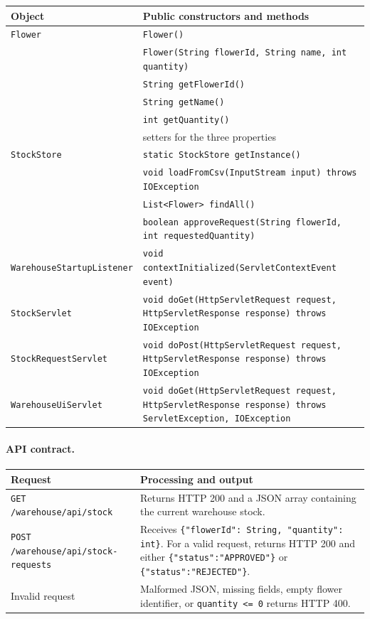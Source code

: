 \documentclass[12pt,a4paper]{article}
\begin{document}
\begin{longtable}{p{}p{}}
\toprule
\textbf{Object} & \textbf{Public constructors and methods}\\
\midrule
\endhead
\texttt{Flower} &
\texttt{Flower()}\\
& \texttt{Flower(String flowerId, String name, int quantity)}\\
& \texttt{String getFlowerId()}\\
& \texttt{String getName()}\\
& \texttt{int getQuantity()}\\
& setters for the three properties\\[2pt]
\texttt{StockStore} &
\texttt{static StockStore getInstance()}\\
& \texttt{void loadFromCsv(InputStream input) throws IOException}\\
& \texttt{List<Flower> findAll()}\\
& \texttt{boolean approveRequest(String flowerId, int requestedQuantity)}\\[2pt]
\texttt{WarehouseStartupListener} &
\texttt{void contextInitialized(ServletContextEvent event)}\\[2pt]
\texttt{StockServlet} &
\texttt{void doGet(HttpServletRequest request, HttpServletResponse response)
throws IOException}\\[2pt]
\texttt{StockRequestServlet} &
\texttt{void doPost(HttpServletRequest request, HttpServletResponse response)
throws IOException}\\[2pt]
\texttt{WarehouseUiServlet} &
\texttt{void doGet(HttpServletRequest request, HttpServletResponse response)
throws ServletException, IOException}\\
\bottomrule
\end{longtable}

\paragraph{API contract.}

\begin{longtable}{p{}p{}}
\toprule
\textbf{Request} & \textbf{Processing and output}\\
\midrule
\texttt{GET /warehouse/api/stock} &
Returns HTTP 200 and a JSON array containing the current warehouse stock.\\
\texttt{POST /warehouse/api/stock-requests} &
Receives \texttt{\{"flowerId": String, "quantity": int\}}. For a valid
request, returns HTTP 200 and either \texttt{\{"status":"APPROVED"\}} or
\texttt{\{"status":"REJECTED"\}}.\\
Invalid request &
Malformed JSON, missing fields, empty flower identifier, or
\texttt{quantity <= 0} returns HTTP 400.\\
\bottomrule
\end{longtable}
\end{document}
